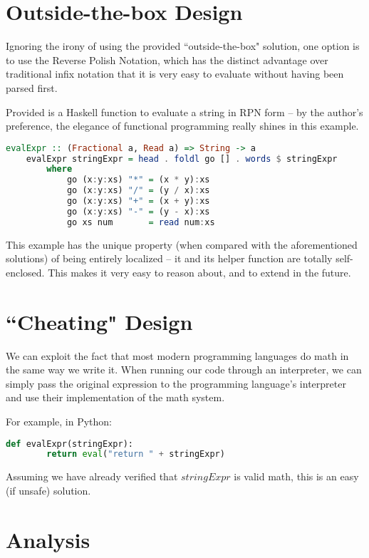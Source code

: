 \documentclass[]{article}
\begin{document}
\newpage
\section{Outside-the-box Design}

Ignoring the irony of using the provided ``outside-the-box" solution, one option is to use the Reverse Polish Notation, which has the distinct advantage over traditional infix notation that it is very easy to evaluate without having been parsed first.

Provided is a Haskell function to evaluate a string in RPN form -- by the author's preference, the elegance of functional programming really shines in this example.

\begin{lstlisting}[language=haskell]
    evalExpr :: (Fractional a, Read a) => String -> a  
    evalExpr stringExpr = head . foldl go [] . words $ stringExpr
        where
            go (x:y:xs) "*" = (x * y):xs  
            go (x:y:xs) "/" = (y / x):xs  
            go (x:y:xs) "+" = (x + y):xs  
            go (x:y:xs) "-" = (y - x):xs  
            go xs num       = read num:xs  
\end{lstlisting}

This example has the unique property (when compared with the aforementioned solutions) of being entirely localized -- it and its helper function are totally self-enclosed. This makes it very easy to reason about, and to extend in the future.


\section{``Cheating" Design}

We can exploit the fact that most modern programming languages do math in the same way we write it. When running our code through an interpreter, we can simply pass the original expression to the programming language's interpreter and use their implementation of the math system.

For example, in Python:

\begin{lstlisting}[language=python]
    def evalExpr(stringExpr):
        return eval("return " + stringExpr)
\end{lstlisting}

Assuming we have already verified that $stringExpr$ is valid math, this is an easy (if unsafe) solution.


\newpage
\section{Analysis}
\end{document}

